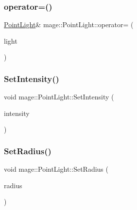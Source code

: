 \hypertarget{classmage_1_1_point_light_aa9f704206fe06f21ce0e70c82f7b6b1b}{}\label{classmage_1_1_point_light_aa9f704206fe06f21ce0e70c82f7b6b1b} 
\subsubsection{\texorpdfstring{operator=()}{operator=()}\hspace{0.1cm}{\footnotesize\ttfamily [2/2]}}
{\footnotesize\ttfamily \hyperlink{classmage_1_1_point_light}{Point\+Light}\& mage\+::\+Point\+Light\+::operator= (\begin{DoxyParamCaption}\item[{\hyperlink{classmage_1_1_point_light}{Point\+Light} \&\&}]{light }\end{DoxyParamCaption})\hspace{0.3cm}{\ttfamily [default]}}

\hypertarget{classmage_1_1_point_light_a40c0790159f687fd653a4792f8b39a21}{}\label{classmage_1_1_point_light_a40c0790159f687fd653a4792f8b39a21} 
\subsubsection{\texorpdfstring{Set\+Intensity()}{SetIntensity()}}
{\footnotesize\ttfamily void mage\+::\+Point\+Light\+::\+Set\+Intensity (\begin{DoxyParamCaption}\item[{const \hyperlink{structmage_1_1_r_g_b_spectrum}{R\+G\+B\+Spectrum} \&}]{intensity }\end{DoxyParamCaption})}

\hypertarget{classmage_1_1_point_light_ae7b4c301c148bd78348e26e5b6ad8faf}{}\label{classmage_1_1_point_light_ae7b4c301c148bd78348e26e5b6ad8faf} 
\subsubsection{\texorpdfstring{Set\+Radius()}{SetRadius()}}
{\footnotesize\ttfamily void mage\+::\+Point\+Light\+::\+Set\+Radius (\begin{DoxyParamCaption}\item[{float}]{radius }\end{DoxyParamCaption})}



